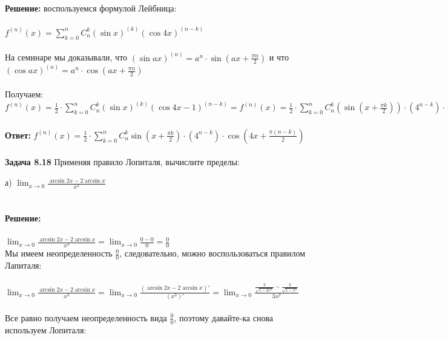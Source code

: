 \documentclass[12pt]{article}
\begin{document}
    \\
    \\ \textbf{Решение: } воспользуемся формулой Лейбница:
    \\
    \\ $f^{(n)}(x) = \sum_{k=0}^{n} C_n^k (\sin{x})^{(k)} (\cos{4x})^{(n - k)}$
    \\
    \\ На семинаре мы доказывали, что $(\sin{ax})^{(n)} = a^{n} \cdot \sin(ax + \frac{\pi n}{2})$ и что $(\cos{ax})^{(n)} = a^{n} \cdot \cos{\left(ax + \frac{\pi n}{2}\right)}$
    \\
    \\ Получаем: $f^{(n)}(x) = \frac{1}{2} \cdot \sum_{k=0}^{n} C_n^k (\sin{x})^{(k)} (\cos{4x} - 1)^{(n - k)} = f^{(n)}(x) = \frac{1}{2} \cdot \sum_{k=0}^{n} C_n^k (\sin{\left(x + \frac{\pi k}{2}\right)}) \cdot (4^{n - k}) \cdot \cos{\left(4x + \frac{\pi (n - k)}{2}\right)}$
    \\
    \\ \textbf{Ответ: } $f^{(n)}(x) = \frac{1}{2} \cdot \sum_{k=0}^{n} C_n^k \sin{\left(x + \frac{\pi k}{2}\right)} \cdot (4^{n - k}) \cdot \cos{\left(4x + \frac{\pi (n - k)}{2}\right)}$
    \\
    \\
    {\large \bf Задача 8.18} Применяя правило Лопиталя, вычислите пределы:
    \\
    \par а) $\lim_{x\to 0} \limits \frac{\arcsin{2x} - 2\arcsin{x}}{x^3}$\\
    \\
    \\ \textbf{Решение: }
    \\
    \\ $\lim_{x\to 0} \limits \frac{\arcsin{2x} - 2\arcsin{x}}{x^3} = \lim_{x\to 0} \limits \frac{0 - 0}{0} = \frac{0}{0}$ 
    \\ Мы имеем неопределенность $\frac{0}{0}$, следовательно, можно воспользоваться правилом Лапиталя:
    \\
    \\ $\lim_{x\to 0} \limits \frac{\arcsin{2x} - 2\arcsin{x}}{x^3} = \lim_{x\to 0} \limits \frac{(\arcsin{2x} - 2\arcsin{x})'}{(x^3)'} = \lim_{x\to 0} \limits \frac{\frac{2}{\sqrt{1 - 4x^2}} - \frac{2}{\sqrt{1 - x^2}}}{3x^2}$
    \\
    \\ Все равно получаем неопределенность вида $\frac{0}{0}$, поэтому давайте-ка снова используем Лопиталя:
    \\
\end{document}
